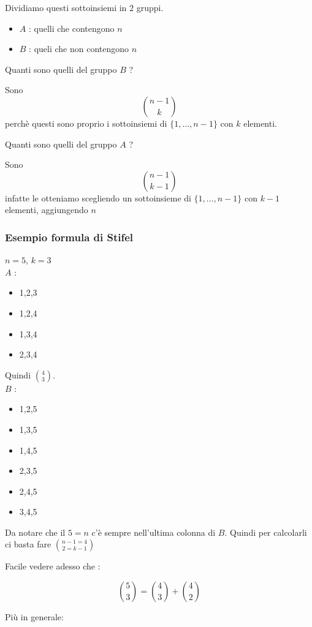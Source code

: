 \documentclass[11pt]{article}
\begin{document}
			Dividiamo questi sottoinsiemi in $2$ gruppi.
			
			\begin{itemize}
				\item $A$ : quelli che contengono $n$
				\item $B$ : queli che non contengono $n$
			\end{itemize}

			Quanti sono quelli del gruppo $B$ ?

			Sono \[\binom{n-1}{k}\] perchè questi sono proprio i sottoinsiemi
			di $\{1,\ldots,n-1\}$ con $k$ elementi.

			Quanti sono quelli del gruppo $A$ ?

			Sono \[\binom{n-1}{k-1}\] infatte le otteniamo scegliendo un
			sottoinsieme di $\{1,\ldots,n-1\}$ con $k-1$ elementi, aggiungendo $n$

			\subsubsection{Esempio formula di Stifel}

			$n=5$, $k=3$\\

			$A$ : \begin{itemize}
				\item 1,2,3
				\item 1,2,4
				\item 1,3,4
				\item 2,3,4
			\end{itemize}

			Quindi $\binom{4}{3}$.\\

			$B$ : \begin{itemize}
				\item 1,2,5
				\item 1,3,5
				\item 1,4,5
				\item 2,3,5
				\item 2,4,5
				\item 3,4,5
			\end{itemize}

			Da notare che il $5 = n$ c'\`e sempre nell'ultima colonna di $B$.
			Quindi per calcolarli ci basta fare $\binom{n-1=4}{2=k-1}$

			Facile vedere adesso che :

			\[
				\binom{5}{3} = \binom{4}{3} + \binom{4}{2}
			\]

			Pi\`u in generale:
\end{document}
